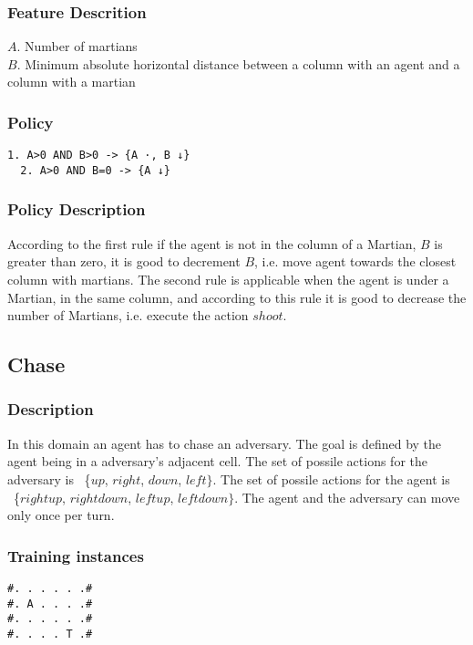 \documentclass[a4paper]{article}
\begin{document}
\subsubsection{Feature Descrition}
$A$. Number of martians\\
$B$. Minimum absolute horizontal distance between a column with an agent and a column with a martian

\subsubsection{Policy}
\begin{Verbatim}[fontsize=\footnotesize]
  1. A>0 AND B>0 -> {A ·, B ↓}
  2. A>0 AND B=0 -> {A ↓}
\end{Verbatim}

\subsubsection{Policy Description}
According to the first rule if the agent is not in the column of a Martian, $B$ is greater than zero, it is good to decrement $B$, i.e. move agent towards the closest column with martians. The second rule is applicable when the agent is under a Martian, in the same column, and according to this rule it is good to decrease the number of Martians, i.e. execute the action $shoot$.

\subsection{Chase}
\subsubsection{Description}
In this domain an agent has to chase an adversary. The goal is defined by the agent being in a adversary's adjacent cell. The set of possile actions for the adversary is ~\{$up$, $right$, $down$, $left\}$. The set of possile actions for the agent is ~\{$rightup$, $rightdown$, $leftup$, $leftdown\}$. The agent and the adversary can move only once per turn.

\subsubsection{Training instances}
\begin{Verbatim}[fontsize=\footnotesize]
#. . . . . .#
#. A . . . .#
#. . . . . .#
#. . . . T .#
\end{Verbatim}
\end{document}
